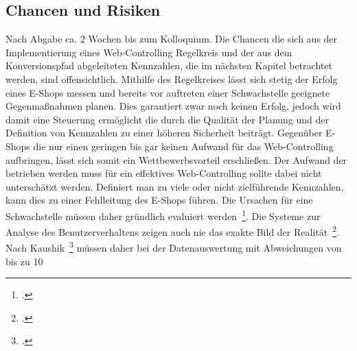\subsection{Chancen und Risiken}
Nach Abgabe ca. 2 Wochen bis zum Kolloquium.
Die Chancen die sich aus der Implementierung eines Web-Controlling Regelkreis und der aus dem Konversionspfad abgeleiteten Kennzahlen, die im nächsten Kapitel betrachtet werden, sind offensichtlich. Mithilfe des Regelkreises lässt sich stetig der Erfolg eines E-Shops messen und bereits vor auftreten einer Schwachstelle geeignete Gegenmaßnahmen planen. Dies garantiert zwar noch keinen Erfolg, jedoch wird damit eine Steuerung ermöglicht die durch die Qualität der Planung und der Definition von Kennzahlen zu einer höheren Sicherheit beiträgt. Gegenüber E-Shops die nur einen geringen bis gar keinen Aufwand für das Web-Controlling aufbringen, lässt sich somit ein Wettbewerbsvorteil erschließen.
Der Aufwand der betrieben werden muss für ein effektives Web-Controlling sollte dabei nicht unterschätzt werden. Definiert man zu viele oder nicht zielführende Kennzahlen, kann dies zu einer Fehlleitung des E-Shops führen. Die Ursachen für eine Schwachstelle müssen daher gründlich evaluiert werden~\footcite[Vgl. ][Seite 71]{Hassler.2007}. Die Systeme zur Analyse des Benutzerverhaltens zeigen auch nie das exakte Bild der Realität~\footcite[Vgl. ][Seite 35]{Hassler.2010}. Nach Kaushik~\footcite[Vgl. ][Seite 110]{Hassler.2007} müssen daher bei der Datenauswertung mit Abweichungen von bis zu 10%


